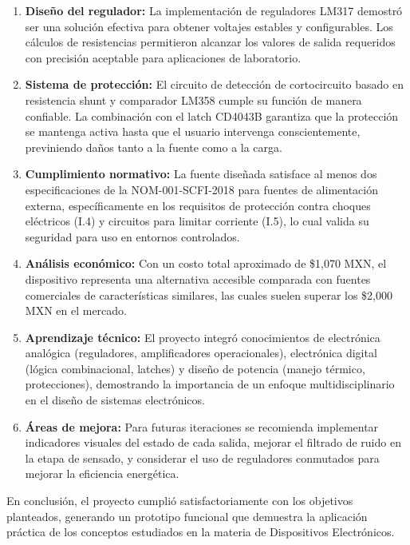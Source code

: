 \documentclass[pdflatex,sn-mathphys-num]{sn-jnl}%
\begin{document}
\begin{enumerate}
    \item \textbf{Diseño del regulador:} La implementación de reguladores LM317 demostró ser una solución efectiva para obtener voltajes estables y configurables. Los cálculos de resistencias permitieron alcanzar los valores de salida requeridos con precisión aceptable para aplicaciones de laboratorio.
    
    \item \textbf{Sistema de protección:} El circuito de detección de cortocircuito basado en resistencia shunt y comparador LM358 cumple su función de manera confiable. La combinación con el latch CD4043B garantiza que la protección se mantenga activa hasta que el usuario intervenga conscientemente, previniendo daños tanto a la fuente como a la carga.
    
    \item \textbf{Cumplimiento normativo:} La fuente diseñada satisface al menos dos especificaciones de la NOM-001-SCFI-2018 para fuentes de alimentación externa, específicamente en los requisitos de protección contra choques eléctricos (I.4) y circuitos para limitar corriente (I.5), lo cual valida su seguridad para uso en entornos controlados.
    
    \item \textbf{Análisis económico:} Con un costo total aproximado de \$1,070 MXN, el dispositivo representa una alternativa accesible comparada con fuentes comerciales de características similares, las cuales suelen superar los \$2,000 MXN en el mercado.
    
    \item \textbf{Aprendizaje técnico:} El proyecto integró conocimientos de electrónica analógica (reguladores, amplificadores operacionales), electrónica digital (lógica combinacional, latches) y diseño de potencia (manejo térmico, protecciones), demostrando la importancia de un enfoque multidisciplinario en el diseño de sistemas electrónicos.
    
    \item \textbf{Áreas de mejora:} Para futuras iteraciones se recomienda implementar indicadores visuales del estado de cada salida, mejorar el filtrado de ruido en la etapa de sensado, y considerar el uso de reguladores conmutados para mejorar la eficiencia energética.
\end{enumerate}

En conclusión, el proyecto cumplió satisfactoriamente con los objetivos planteados, generando un prototipo funcional que demuestra la aplicación práctica de los conceptos estudiados en la materia de Dispositivos Electrónicos.
\end{document}
